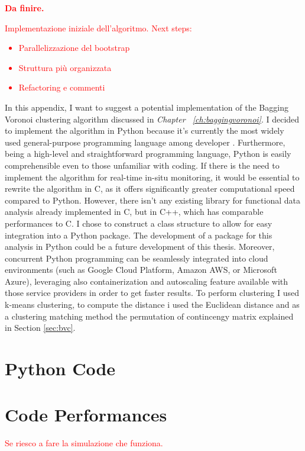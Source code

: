\textbf{\textcolor{red}{Da finire.}}\\
\textcolor{red}{Implementazione iniziale dell'algoritmo. Next steps:
\begin{itemize}
    \item Parallelizzazione del bootstrap
    \item Struttura più organizzata
    \item Refactoring e commenti
\end{itemize}}
In this appendix, I want to suggest a potential implementation of the Bagging Voronoi clustering algorithm discussed in \emph{Chapter ~\ref{ch:baggingvoronoi}}. I decided to implement the algorithm in Python because it's currently the most widely used general-purpose programming language among developer \cite{lionel_sujay_vailshery_most_2023}. Furthermore, being a high-level and straightforward programming language, Python is easily comprehensible even to those unfamiliar with coding. If there is the need to implement the algorithm for real-time in-situ monitoring, it would be essential to rewrite the algorithm in C, as it offers significantly greater computational speed compared to Python. However, there isn't any existing library for functional data analysis already implemented in C, but in C++, which has comparable performances to C. I chose to construct a class structure to allow for easy integration into a Python package. The development of a package for this analysis in Python could be a future development of this thesis. Moreover, concurrent Python programming can be seamlessly integrated into cloud environments (such as Google Cloud Platform, Amazon AWS, or Microsoft Azure), leveraging also containerization and autoscaling feature available with those service providers in order to get faster results. To perform clustering I used k-means clustering, to compute the distance i used the Euclidean distance and as a clustering matching method the permutation of contincengy matrix explained in Section \ref{sec:bvc}.
\section{Python Code}


\section{Code Performances}
\textcolor{red}{Se riesco a fare la simulazione che funziona.}

